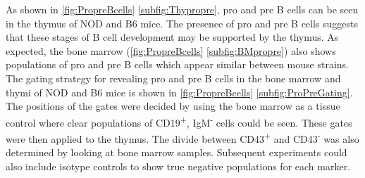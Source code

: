 As shown in \cref{fig:PropreBcells} \ref{subfig:Thypropre}, pro and pre B cells can be seen in the thymus of NOD and B6 mice.
The presence of pro and pre B cells suggests that these stages of B cell development may be supported by the thymus. 
As expected, the bone marrow (\cref{fig:PropreBcells} \ref{subfig:BMpropre}) also shows populations of pro and pre B cells which appear similar between mouse strains.
The gating strategy for revealing pro and pre B cells in the bone marrow and thymi of NOD and B6 mice is shown in \cref{fig:PropreBcells} \ref{subfig:ProPreGating}.
The positions of the gates were decided by using the bone marrow as a tissue control where clear populations of CD19\textsuperscript{+}, IgM\textsuperscript{-} cells could be seen. These gates were then applied to the thymus. The divide between CD43\textsuperscript{+} and CD43\textsuperscript{-} was also determined by looking at bone marrow samples. 
Subsequent experiments could also include isotype controls to show true negative populations for each marker. 





